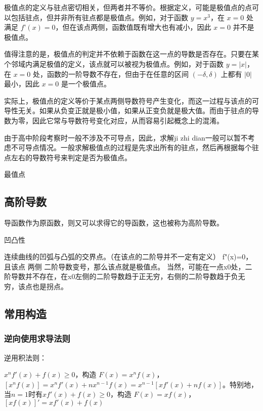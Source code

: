 极值点的定义与驻点密切相关，但两者并不等价。根据定义，可能是极值点的点可以包括驻点，但并非所有驻点都是极值点。例如，对于函数 $y = x^3$，在 $x = 0$ 处满足 $f’(x) = 0$，但在该点两侧，函数值既有增大也有减小，因此 $x = 0$ 并不是极值点。

值得注意的是，极值点的判定并不依赖于函数在这一点的导数是否存在。只要在某个邻域内满足极值的定义，该点就可以被视为极值点。例如，对于函数 $y = |x|$，在 $x = 0$ 处，函数的一阶导数不存在，但由于在任意的区间 $(-\delta, \delta)$ 上都有 $|0|$ 最小，因此 $x = 0$ 是一个极值点。

实际上，极值点的定义等价于某点两侧导数符号产生变化，而这一过程与该点的可导性无关。如果从负变正就是极小值，如果从正变负就是极大值。而由于驻点的导数为零，因此它常与导数符号变化对应，从而容易引起概念上的混淆。


由于高中阶段考察时一般不涉及不可导点，因此，求解ji zhi dian一般可以暂不考虑不可导点情况。一般求解极值点的过程是先求出所有的驻点，然后再根据每个驻点左右的导数符号来判定是否为极值点。

最值点

\subsection{高阶导数}

导函数作为原函数，则又可以求得它的导函数，这也被称为高阶导数。

凹凸性

连续曲线的凹弧与凸弧的交界点。（在该点的二阶导并不一定有定义）
f"(x)=0，且该点 两侧 二阶导数变号，那么该点就是极值点。
当然，可能在一点x0处，二阶导数并不存在，在x0左侧的二阶导数趋于正无穷，右侧的二阶导数趋于负无穷，该点也是拐点。

\subsection{常用构造}


\subsubsection{逆向使用求导法则}

逆用积法则：

$x^n f'(x) + f(x) \geq 0$，构造 $F(x) = x^n f(x)$，$[x^n f(x)] = x^n f'(x) + nx^{n-1} f(x) = x^{n-1} [x f'(x) + nf(x)]$。特别地，当$n=1$时有$x f'(x) + f(x) \geq 0$，构造 $F(x) = x f(x)$，$[x f(x)]' = x f'(x) + f(x)$

